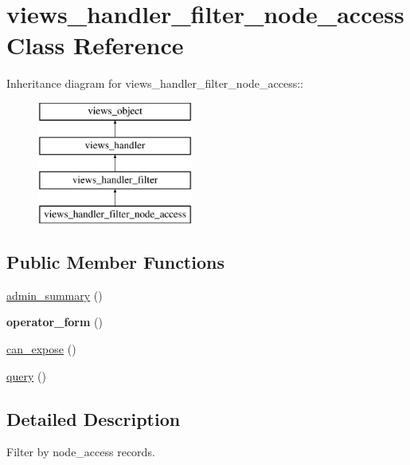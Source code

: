 \hypertarget{classviews__handler__filter__node__access}{
\section{views\_\-handler\_\-filter\_\-node\_\-access Class Reference}
\label{classviews__handler__filter__node__access}
}
Inheritance diagram for views\_\-handler\_\-filter\_\-node\_\-access::\begin{figure}[H]
\begin{center}
\leavevmode
\includegraphics[height=4cm]{classviews__handler__filter__node__access}
\end{center}
\end{figure}
\subsection*{Public Member Functions}
\begin{CompactItemize}
\item 
\hyperlink{classviews__handler__filter__node__access_2f3abe4aa9418904e52937d1549fd560}{admin\_\-summary} ()
\item 
\hypertarget{classviews__handler__filter__node__access_9386ae1ed7ca553644d49a1964907e3a}{
\textbf{operator\_\-form} ()}
\label{classviews__handler__filter__node__access_9386ae1ed7ca553644d49a1964907e3a}

\item 
\hyperlink{classviews__handler__filter__node__access_20eacba1b9be3c0e6b8245191b60a9ff}{can\_\-expose} ()
\item 
\hyperlink{classviews__handler__filter__node__access_b7f054a6a94abf2f41ce70fd40cf2e5e}{query} ()
\end{CompactItemize}


\subsection{Detailed Description}
Filter by node\_\-access records. 

